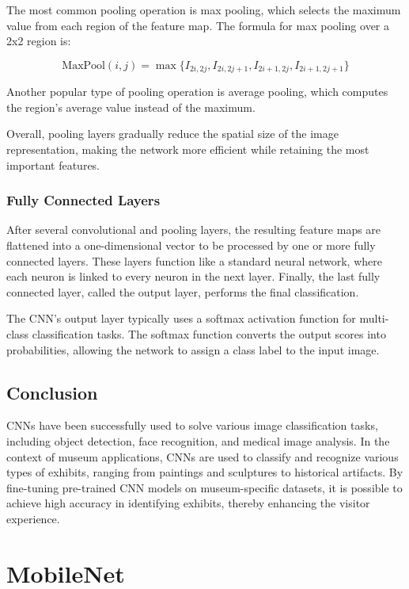 The most common pooling operation is max pooling, which selects the maximum value from each region of the feature map. The formula for max pooling over a 2x2 region is:

\[
\text{MaxPool}(i,j) = \max \{ I_{2i,2j}, I_{2i,2j+1}, I_{2i+1,2j}, I_{2i+1,2j+1} \}
\]

Another popular type of pooling operation is average pooling, which computes the region's average value instead of the maximum.

Overall, pooling layers gradually reduce the spatial size of the image representation, making the network more efficient while retaining the most important features. 

\subsubsection{Fully Connected Layers}

After several convolutional and pooling layers, the resulting feature maps are flattened into a one-dimensional vector to be processed by one or more fully connected layers. These layers function like a standard neural network, where each neuron is linked to every neuron in the next layer. Finally, the last fully connected layer, called the output layer, performs the final classification.

The CNN's output layer typically uses a softmax activation function for multi-class classification tasks. The softmax function converts the output scores into probabilities, allowing the network to assign a class label to the input image.

\subsection{Conclusion}

CNNs have been successfully used to solve various image classification tasks, including object detection, face recognition, and medical image analysis. In the context of museum applications, CNNs are used to classify and recognize various types of exhibits, ranging from paintings and sculptures to historical artifacts. By fine-tuning pre-trained CNN models on museum-specific datasets, it is possible to achieve high accuracy in identifying exhibits, thereby enhancing the visitor experience.

\section{MobileNet}\label{section:mobilenet}

